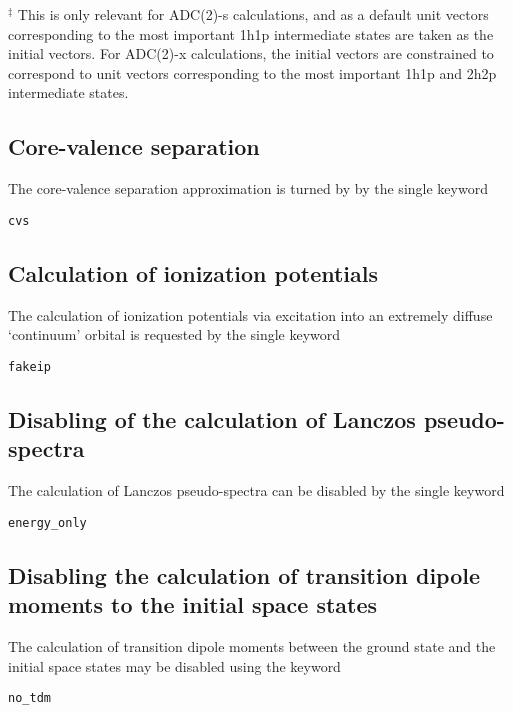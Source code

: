 \documentclass[12pt]{article}
\newcommand*\code[1]{\mbox{\texttt{{#1}}}} %
\begin{document}
\vspace{0.4cm}
\noindent
$^{\ddagger}$ This is only relevant for ADC(2)-s calculations, and as
a default unit vectors corresponding to the most important 1h1p
intermediate states are taken as the initial vectors. For ADC(2)-x
calculations, the initial vectors are constrained to correspond to
unit vectors corresponding to the most important 1h1p and 2h2p
intermediate states.

\subsection*{Core-valence separation}
\noindent
The core-valence separation approximation is turned by by the single
keyword 

\vspace{0.2cm}
\code{cvs}

\subsection*{Calculation of ionization potentials}
\noindent
The calculation of ionization potentials via excitation into an
extremely diffuse `continuum' orbital is requested by the single
keyword

\vspace{0.2cm}
\code{fakeip}

\subsection*{Disabling of the calculation of Lanczos pseudo-spectra}
\noindent
The calculation of Lanczos pseudo-spectra can be disabled by the
single keyword 

\vspace{0.2cm}
\code{energy\_only}

\subsection*{Disabling the calculation of transition dipole moments to
the initial space states}
\noindent
The calculation of transition dipole moments between the ground state
and the initial space states may be disabled using the keyword

\vspace{0.2cm}
\code{no\_tdm}
\end{document}
